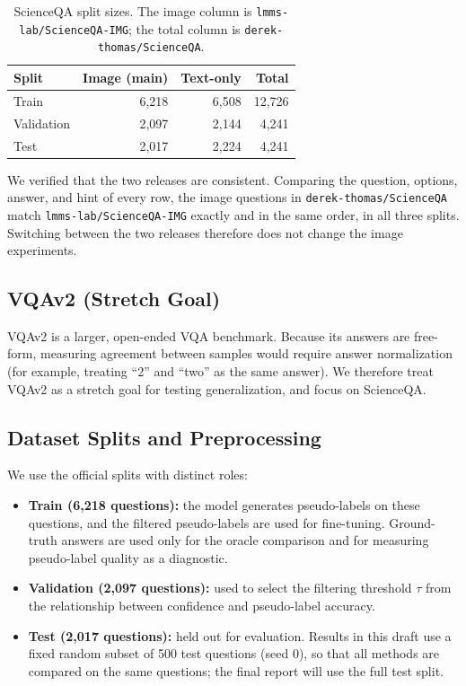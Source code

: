\documentclass{article}
\begin{document}
\begin{table}[t]
\centering
\small
\begin{tabular}{lrrr}
\toprule
Split & Image (main) & Text-only & Total \\
\midrule
Train & 6,218 & 6,508 & 12,726 \\
Validation & 2,097 & 2,144 & 4,241 \\
Test & 2,017 & 2,224 & 4,241 \\
\bottomrule
\end{tabular}
\caption{ScienceQA split sizes. The image column is \texttt{lmms-lab/ScienceQA-IMG}; the total column is \texttt{derek-thomas/ScienceQA}.}
\label{tab:counts}
\end{table}

We verified that the two releases are consistent. Comparing the question, options, answer, and hint of every row, the image questions in \texttt{derek-thomas/ScienceQA} match \texttt{lmms-lab/ScienceQA-IMG} exactly and in the same order, in all three splits. Switching between the two releases therefore does not change the image experiments.

\subsection{VQAv2 (Stretch Goal)}
VQAv2 \citep{goyal2017vqav2} is a larger, open-ended VQA benchmark. Because its answers are free-form, measuring agreement between samples would require answer normalization (for example, treating ``2'' and ``two'' as the same answer). We therefore treat VQAv2 as a stretch goal for testing generalization, and focus on ScienceQA.

\subsection{Dataset Splits and Preprocessing}
We use the official splits with distinct roles:
\begin{itemize}[itemsep=1pt,topsep=2pt]
  \item \textbf{Train (6,218 questions):} the model generates pseudo-labels on these questions, and the filtered pseudo-labels are used for fine-tuning. Ground-truth answers are used only for the oracle comparison and for measuring pseudo-label quality as a diagnostic.
  \item \textbf{Validation (2,097 questions):} used to select the filtering threshold $\tau$ from the relationship between confidence and pseudo-label accuracy.
  \item \textbf{Test (2,017 questions):} held out for evaluation. Results in this draft use a fixed random subset of 500 test questions (seed 0), so that all methods are compared on the same questions; the final report will use the full test split.
\end{itemize}
\end{document}
